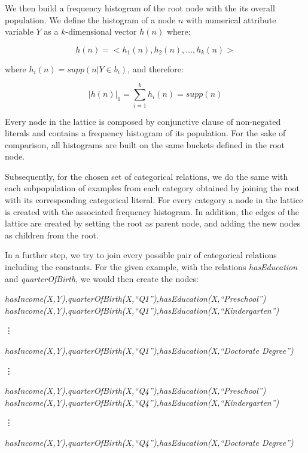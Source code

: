 We then build a frequency histogram of the root node with the its overall population. We define the histogram of a
node
$n$ with numerical attribute variable $Y$ as a $k$-dimensional vector $h(n)$ where:

\begin{equation}
 h(n)=<h_1(n),h_2(n),\ldots,h_k(n)>
\end{equation}

where $h_i(n)=supp(n|Y \in b_i)$, and therefore:

\begin{equation}
  |h(n)|_1=\sum_{i=1}^{k}h_i(n)=supp(n)
\end{equation}

Every node in the lattice is composed by conjunctive clause of non-negated literals and contains a frequency histogram
of its population. For the sake of comparison, all histograms are built on the same buckets defined in the
root node. 

Subsequently, for the chosen set of categorical relations, we do the same with each subpopulation of examples from
each
category obtained by joining the root with its corresponding categorical literal. For every category a node in
the lattice is created with the associated frequency histogram. In addition, the edges of the lattice are created by
setting the root as parent node, and adding the new nodes as children from the root.

In a further step, we try to join every possible pair of categorical relations including the constants. For the
given example, with the relations \emph{hasEducation} and \emph{quarterOfBirth}, we would then create the nodes:

  \emph{hasIncome(X,Y),quarterOfBirth(X,``Q1''),hasEducation(X,``Preschool'')} \newline
  \emph{hasIncome(X,Y),quarterOfBirth(X,``Q1''),hasEducation(X,``Kindergarten'')} \newline
  \centerline{\vdots} 
  \emph{hasIncome(X,Y),quarterOfBirth(X,``Q1''),hasEducation(X,``Doctorate Degree'')} \newline

  \centerline{\vdots} 

  \emph{hasIncome(X,Y),quarterOfBirth(X,``Q4''),hasEducation(X,``Preschool'')} \newline
  \emph{hasIncome(X,Y),quarterOfBirth(X,``Q4''),hasEducation(X,``Kindergarten'')} \newline
  \centerline{\vdots} 
  \emph{hasIncome(X,Y),quarterOfBirth(X,``Q4''),hasEducation(X,``Doctorate Degree'')} \newline



